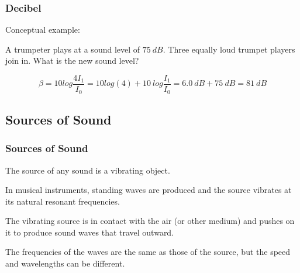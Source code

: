 \documentclass[]{beamer}
\begin{document}

\begin{frame}
\frametitle{Decibel}
Conceptual example:

\vspace{3mm}

A trumpeter plays at a sound level of $75~dB$. Three equally loud trumpet players join in. What is the new
sound level?

\begin{equation*}
\beta =10 log\frac{4 I_1}{I_0}=10log(4)+10~log\frac{ I_1}{I_0}=6.0~dB+75~dB=81~dB
\end{equation*}


  \end{frame}

\subsection{Sources of Sound}

\begin{frame}
\frametitle{Sources of Sound}

The source of any sound is a vibrating object.
\pause
\vspace{3mm}

In musical instruments, standing
waves are produced and the source vibrates at its natural resonant frequencies.
\pause
\vspace{3mm}

The vibrating source is in contact with the air (or other medium) and pushes on it to
produce sound waves that travel outward.
\vspace{3mm}
\pause

The frequencies of the waves are the same
as those of the source, but the speed and wavelengths can be different.



  \end{frame}



\end{document}
